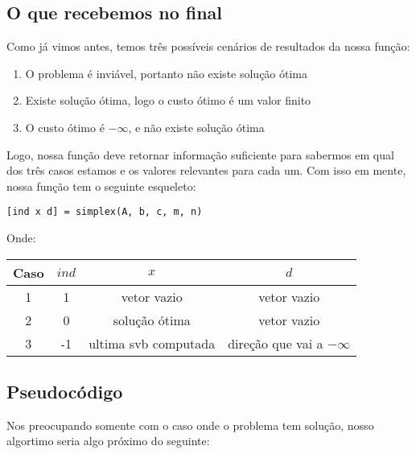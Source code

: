 \documentclass[12pt]{article}
\begin{document}
\subsection{O que recebemos no final}
    Como já vimos antes, temos três possíveis cenários de resultados da nossa função:
    \begin{enumerate}
        \item O problema é inviável, portanto não existe solução ótima
        \item Existe solução ótima, logo o custo ótimo é um valor finito
        \item O custo ótimo é $-\infty$, e não existe solução ótima
    \end{enumerate}
    Logo, nossa função deve retornar informação suficiente para sabermos em qual dos três casos estamos e os valores relevantes para cada um. Com isso em mente, nossa função tem o seguinte esqueleto:
    \begin{center}
        \texttt{[ind x d] = simplex(A, b, c, m, n)}
    \end{center}
    Onde:
    \begin{center}
    \begin{tabular}{ c  c  c  c }
        \textbf{Caso} & $ind$ & $x$  & $d$ \\  \hline
        1    & 1   & vetor vazio & vetor vazio \\
        2    & 0   & solução ótima & vetor vazio \\
        3    & -1  & ultima svb computada & direção que vai a $-\infty$ \\
    \end{tabular}
    \end{center}

\subsection{Pseudocódigo}
    Nos preocupando somente com o caso onde o problema tem solução, nosso algortimo seria algo próximo do seguinte: 
\end{document}

